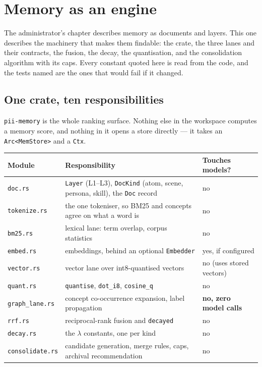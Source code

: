 \chapter{Memory as an engine}

\label{ch:memory-engine}

The administrator's chapter describes memory as documents and layers. This one describes the
machinery that makes them findable: the crate, the three lanes and their contracts, the fusion,
the decay, the quantisation, and the consolidation algorithm with its caps. Every constant quoted
here is read from the code, and the tests named are the ones that would fail if it changed.

\section{One crate, ten responsibilities}

\texttt{pii-memory} is the whole ranking surface. Nothing else in the workspace computes a memory
score, and nothing in it opens a store directly --- it takes an \texttt{Arc<MemStore>} and a
\texttt{Ctx}.

\begin{longtable}{@{}p{}p{}p{}@{}}
  \toprule
  \textbf{Module} & \textbf{Responsibility} & \textbf{Touches models?} \\
  \midrule
  \endhead
  \texttt{doc.rs} & \texttt{Layer} (L1--L3), \texttt{DocKind} (atom, scene, persona, skill), the \texttt{Doc} record & no \\
  \texttt{tokenize.rs} & the one tokeniser, so BM25 and concepts agree on what a word is & no \\
  \texttt{bm25.rs} & lexical lane: term overlap, corpus statistics & no \\
  \texttt{embed.rs} & embeddings, behind an optional \texttt{Embedder} & yes, if configured \\
  \texttt{vector.rs} & vector lane over int8-quantised vectors & no (uses stored vectors) \\
  \texttt{quant.rs} & \texttt{quantise}, \texttt{dot\_i8}, \texttt{cosine\_q} & no \\
  \texttt{graph\_lane.rs} & concept co-occurrence expansion, label propagation & \textbf{no, zero model calls} \\
  \texttt{rrf.rs} & reciprocal-rank fusion and \texttt{decayed} & no \\
  \texttt{decay.rs} & the $\lambda$ constants, one per kind & no \\
  \texttt{consolidate.rs} & candidate generation, merge rules, caps, archival recommendation & no \\
  \bottomrule
\end{longtable}

